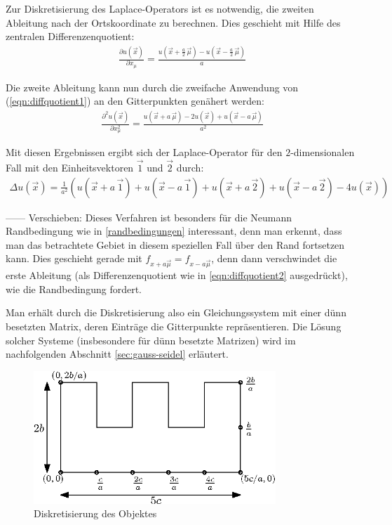 \documentclass[10pt,a4paper]{article}
\begin{document}
Zur Diskretisierung des Laplace-Operators ist es notwendig, die zweiten Ableitung nach der Ortskoordinate zu berechnen. Dies geschieht mit Hilfe des zentralen Differenzenquotient:
\begin{align}
\frac{\partial u(\vec{x})}{\partial x_{\mu}}=\frac{u(\vec{x}+\frac{a}{2}\,\vec{\mu}) - u(\vec{x}-\frac{a}{2}\,\vec{\mu})}{a}
\label{eqn:diffquotient1}
\end{align}

Die zweite Ableitung kann nun durch die zweifache Anwendung von (\ref{eqn:diffquotient1}) an den Gitterpunkten genähert werden:
\begin{align}
\frac{\partial^2 u(\vec{x})}{\partial x_{\mu}^2}=\frac{u(\vec{x}+a\,\vec{\mu})-2 u(\vec{x})+u(\vec{x}-a\,\vec{\mu})}{a^2}
\label{eqn:diffquotient2}
\end{align}

Mit diesen Ergebnissen ergibt sich der Laplace-Operator für den $2$-dimensionalen Fall mit den Einheitsvektoren $\vec{1}$ und $\vec{2}$ durch:
\begin{align}
\Delta u(\vec{x})=\frac{1}{a^2}\left(u(\vec{x}+a\,\vec{1}) + u(\vec{x}-a\,\vec{1}) + u(\vec{x}+a\,\vec{2})+u(\vec{x}-a\,\vec{2}) -4 u(\vec{x})\right)
\label{eqn:diffquotient2}
\end{align}

------
Verschieben: Dieses Verfahren ist besonders für die Neumann Randbedingung wie in  \ref{randbedingungen} interessant, denn man erkennt, dass man das betrachtete Gebiet in diesem speziellen Fall über den Rand fortsetzen kann. Dies geschieht gerade mit $f_{x+a\vec{\mu}}=f_{x-a\vec{\mu}}$, denn dann verschwindet die erste Ableitung (als Differenzenquotient wie in \ref{eqn:diffquotient2} ausgedrückt), wie die Randbedingung fordert.

Man erhält durch die Diskretisierung also ein Gleichungssystem mit einer dünn besetzten Matrix, deren Einträge die Gitterpunkte repräsentieren. Die Lösung solcher Systeme (insbesondere für dünn besetzte Matrizen) wird im nachfolgenden Abschnitt \ref{sec:gauss-seidel} erläutert.

\begin{figure}[htbp!]
\centering
\includegraphics[height=5cm]{./figures/grid.eps}
\caption{Diskretisierung des Objektes}
\end{figure}
\end{document}
